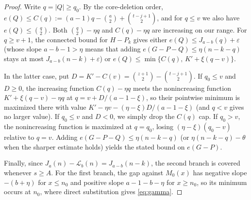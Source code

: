 \documentclass[10pt]{article}
\theoremstyle{compactplain}
\theoremstyle{remark}\newtheorem{remark}[theorem]{Remark}
\begin{document}
\begin{proof}
Write $q=|Q|\ge q_0$. By the core-deletion order,
$e(Q)\le C(q):=(a-1)q-\binom{a}{2}+\binom{t-j+1}{2}$, and for $q\le v$
we also have $e(Q)\le\binom{q}{2}$. Both $\binom{q}{2}-\eta q$ and
$C(q)-\eta q$ are increasing on our range. For $q\ge v+1$, the connected
bound for $H-P_k$ gives either $e(Q)\le J_{a-b}(q)+\varepsilon$ (whose
slope $a-b-1>\eta$ means that adding $e(G-P-Q)\le\eta(n-k-q)$ stays at
most $J_{a-b}(n-k)+\varepsilon$) or
$e(Q)\le\min\{C(q),\,K'+\xi(q-v)\}$.

In the latter case, put $D=K'-C(v)=\binom{z+1}{2}-\binom{t-j+1}{2}$. If
$q_0\le v$ and $D\ge0$, the increasing function $C(q)-\eta q$ meets the
nonincreasing function $K'+\xi(q-v)-\eta q$ at $q=v+D/(a-1-\xi)$, so
their pointwise minimum is maximized there with value
$K'-\eta v-(\eta-\xi)D/(a-1-\xi)$ (and $q<v$ gives no larger value). If
$q_0\le v$ and $D<0$, we simply drop the $C(q)$ cap. If $q_0>v$, the
nonincreasing function is maximized at $q=q_0$, losing
$(\eta-\xi)(q_0-v)$ relative to $q=v$. Adding
$e(G-P-Q)\le\eta(n-k-q)$ (or $\eta(n-k-q)-\theta$ when the sharper
estimate holds) yields the stated bound on $e(G-P)$.

Finally, since $J_a(n)-\mathcal{L}_b(n)=J_{a-b}(n-k)$, the second branch
is covered whenever $s\ge A$. For the first branch, the gap against
$M_0(x)$ has negative slope $-(b+\eta)$ for $x\le n_0$ and positive
slope $a-1-b-\eta$ for $x\ge n_0$, so its minimum occurs at $n_0$, where
direct substitution gives \eqref{eq:gamma}.
\end{proof}
\end{document}
